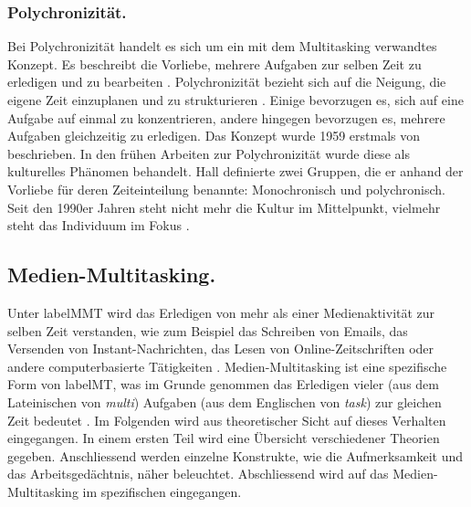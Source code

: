 \subsubsection{Polychronizität.}
Bei Polychronizität handelt es sich um ein mit dem Multitasking verwandtes Konzept. Es beschreibt die Vorliebe, mehrere Aufgaben zur selben Zeit zu erledigen und zu bearbeiten \cite{Baethge2010}. Polychronizität bezieht sich auf die Neigung, die eigene Zeit einzuplanen und zu strukturieren \cite{Hecht2005}. Einige bevorzugen es, sich auf eine Aufgabe auf einmal zu konzentrieren, andere hingegen bevorzugen es, mehrere Aufgaben gleichzeitig zu erledigen. Das Konzept wurde 1959 erstmals von \cite{Hall1980} beschrieben. In den frühen Arbeiten zur Polychronizität wurde diese als kulturelles Phänomen behandelt. Hall definierte zwei Gruppen, die er anhand der Vorliebe für deren Zeiteinteilung benannte: Monochronisch und polychronisch. Seit den 1990er Jahren steht nicht mehr die Kultur im Mittelpunkt, vielmehr steht das Individuum im Fokus \cite{Baethge2010}.

\subsection{Medien-Multitasking.}\label{subsection.medienMultitasking}
Unter \gls{labelMMT} wird das Erledigen von mehr als einer Medienaktivität zur selben Zeit verstanden, wie zum Beispiel das Schreiben von Emails, das Versenden von Instant-Nachrichten, das Lesen von Online-Zeitschriften oder andere computerbasierte Tätigkeiten \cite{Foehr2006}. Medien-Multitasking ist eine spezifische Form von \gls{labelMT}, was im Grunde genommen das Erledigen vieler (aus dem Lateinischen von \textit{multi}) Aufgaben (aus dem Englischen von \textit{task}) zur gleichen Zeit bedeutet \cite{Spitzer2012}.  Im Folgenden wird aus theoretischer Sicht auf dieses Verhalten eingegangen. In einem ersten Teil wird eine Übersicht verschiedener Theorien gegeben. Anschliessend werden einzelne Konstrukte, wie die Aufmerksamkeit und das Arbeitsgedächtnis, näher beleuchtet. Abschliessend wird auf das Medien-Multitasking im spezifischen eingegangen.
\par

